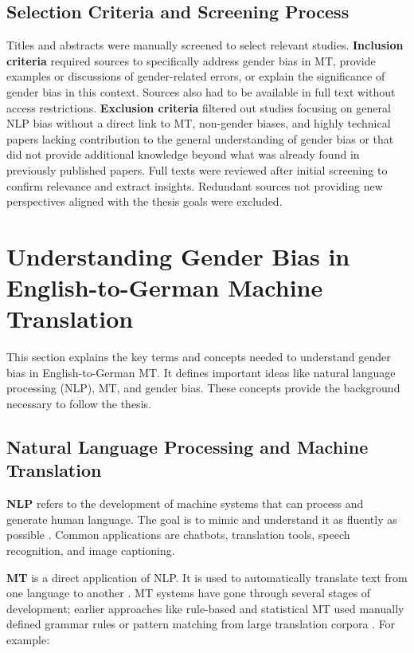 \subsection{Selection Criteria and Screening Process}\label{subsection:selection_criteria}
Titles and abstracts were manually screened to select relevant studies. \textbf{Inclusion criteria} required sources to specifically address gender bias in MT, provide examples or discussions of gender-related errors, or explain the significance of gender bias in this context. Sources also had to be available in full text without access restrictions. \textbf{Exclusion criteria} filtered out studies focusing on general NLP bias without a direct link to MT, non-gender biases, and highly technical papers lacking contribution to the general understanding of gender bias or that did not provide additional knowledge beyond what was already found in previously published papers. Full texts were reviewed after initial screening to confirm relevance and extract insights. Redundant sources not providing new perspectives aligned with the thesis goals were excluded.


\section{Understanding Gender Bias in English-to-German Machine Translation}

This section explains the key terms and concepts needed to understand gender bias in English-to-German MT. It defines important ideas like natural language processing (NLP), MT, and gender bias. These concepts provide the background necessary to follow the thesis.

\subsection{Natural Language Processing and Machine Translation}
\textbf{NLP} refers to the development of machine systems that can process and generate human language. The goal is to mimic and understand it as fluently as possible \citep{smacchiaDoesAIReflect2024,ullmannGenderBiasMachine2022}. Common applications are chatbots, translation tools, speech recognition, and image captioning.

\textbf{MT} is a direct application of NLP. It is used to automatically translate text from one language to another \citep{linMachineTranslationAcademic2009}. MT systems have gone through several stages of development; earlier approaches like rule-based and statistical MT used manually defined grammar rules or pattern matching from large translation corpora \citep{chakravarthiSurveyOrthographicInformation2021}. For example:

